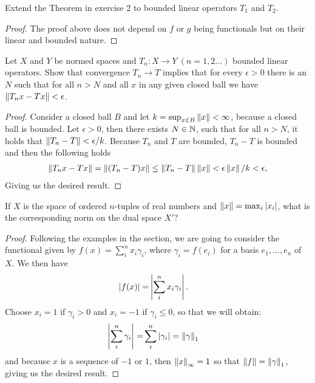 \begin{exercise}{3}
Extend the Theorem in exercise 2 to bounded linear operators $T_1$ and $T_2$.
\end{exercise}
\begin{proof}
The proof above does not depend on $f$ or $g$ being functionals but on their linear and bounded nature.
\end{proof}

\begin{exercise}{4}
Let $X$ and $Y$ be normed spaces and $T_n:X\to Y\ (n=1,2\dots)$ bounded linear operators.
Show that convergence $T_n\to T$ implies that for every $\epsilon>0$ there is an $N$ such that for all $n>N$ and all $x$ in any given closed ball we have $\left\lVert T_nx-Tx\right\rVert <\epsilon$.
\end{exercise}
\begin{proof}
Consider a closed ball $B$ and let $k =\sup_{x\in B}\left\lVert x\right\rVert<\infty$, because a closed ball is bounded.
Let $\epsilon >0$, then there exists $N \in\mathbb{N}$, such that for all $n>N$, it holds that $\left\lVert T_n-T\right\rVert <\epsilon/k$.
Because $T_n$ and $T$ are bounded, $T_n-T$ is bounded and then the following holds
\begin{align*}
    \left\lVert T_nx-Tx\right\rVert 
    = \left\lVert (T_n-T)x\right\rVert
    \leq \left\lVert T_n-T\right\rVert\left\lVert x\right\rVert
    < \epsilon\left\lVert x\right\rVert/k <\epsilon,
\end{align*}
Giving us the desired result.
\end{proof}

\begin{exercise}{6}
If $X$ is the space of ordered $n$-tuples of real numbers and $\left\lVert x\right\rVert=\max_i \left\lvert x_i\right\rvert$, what is the corresponding norm on the dual space $X'$?
\end{exercise}
\begin{proof}
Following the examples in the section, we are going to consider the functional given by $f(x) =\sum_i^n x_i\gamma_i$, where $\gamma_i = f(e_i)$ for a basis $e_1,\dots,e_n$ of $X$.
We then have
\begin{align*}
    \left\lvert f(x)\right\rvert
    =& \left\lvert \sum_i^n x_i\gamma_i\right\rvert.
\end{align*}
Choose $x_i = 1$ if $\gamma_i>0$ and $x_i = -1$ if $\gamma_i \leq 0$, so that we will obtain:
\begin{align*}
    \left\lvert \sum_i^n \gamma_i\right\rvert
    =& \sum_i^n\left\lvert \gamma_i\right\rvert = \left\lVert \gamma\right\rVert_1
\end{align*}
and because $x$ is a sequence of $-1$ or $1$, then $\left\lVert x\right\rVert_\infty=1$ so that $\left\lVert f\right\rVert = \left\lVert \gamma\right\rVert_1$, giving us the desired result.
\end{proof}


